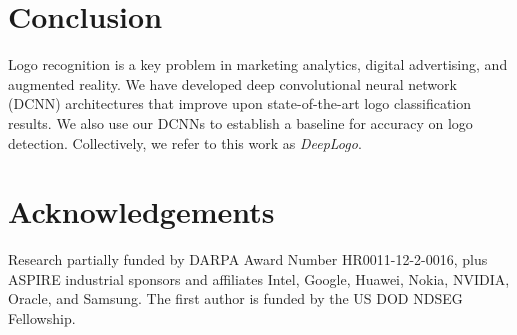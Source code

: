 \documentclass{bmvc2k}
\begin{document}
\section{Conclusion}
\label{sec:conclusion}
Logo recognition is a key problem in marketing analytics, digital advertising, and augmented reality.
We have developed deep convolutional neural network (DCNN) architectures that improve upon state-of-the-art logo classification results.
We also use our DCNNs to establish a baseline for accuracy on logo detection.
Collectively, we refer to this work as {\em DeepLogo}.

\section*{Acknowledgements}
Research partially funded by DARPA Award Number HR0011-12-2-0016, plus ASPIRE industrial sponsors and affiliates Intel, Google, Huawei, Nokia, NVIDIA, Oracle, and Samsung. 
The first author is funded by the US DOD NDSEG Fellowship.


\end{document}
